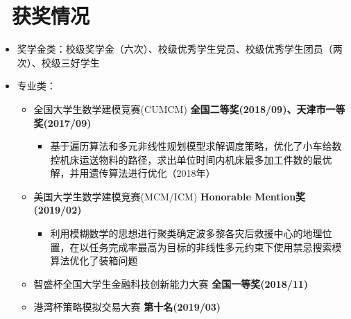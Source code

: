 \documentclass[11pt]{article}
\begin{document}
	\section{\makebox[\widthof{\faGraduationCap}][c]{\color{CVBlue}\faTrophy}\ 获奖情况}
	\begin{itemize}
		
		\item 奖学金类：校级奖学金（六次）、校级优秀学生党员、校级优秀学生团员（两次）、校级三好学生
		\item 专业类： \vspace{-6pt}
		
		\begin{itemize} 
			
			
			\item  全国大学生数学建模竞赛(CUMCM) \quad \textbf{全国二等奖(2018/09)、天津市一等奖(2017/09)} 
			\vspace{-2pt}
			\begin{itemize}
				\item  基于遍历算法和多元非线性规划模型求解调度策略，优化了小车给数控机床运送物料的路径，求出单位时间内机床最多加工件数的最优解，并用遗传算法进行优化（2018年）
				\vspace{-3pt}
			\end{itemize}
			
			
			\item  美国大学生数学建模竞赛(MCM/ICM) \quad \textbf{Honorable Mention奖(2019/02)}  
			\vspace{-2pt}
			\begin{itemize}
				\item  利用模糊数学的思想进行聚类确定波多黎各灾后救援中心的地理位置，在以任务完成率最高为目标的非线性多元约束下使用禁忌搜索模算法优化了装箱问题
				\vspace{-3pt}
			\end{itemize}
			
			
			\item  智盛杯全国大学生金融科技创新能力大赛 \quad \textbf{全国一等奖(2018/11)}  
			\vspace{-2pt}
			\item  港湾杯策略模拟交易大赛 \quad   \textbf{第十名(2019/03)}  \vspace{-2pt}
		\end{itemize}
		
		\vspace{-2pt}		
	\end{itemize}
	
\end{document}
